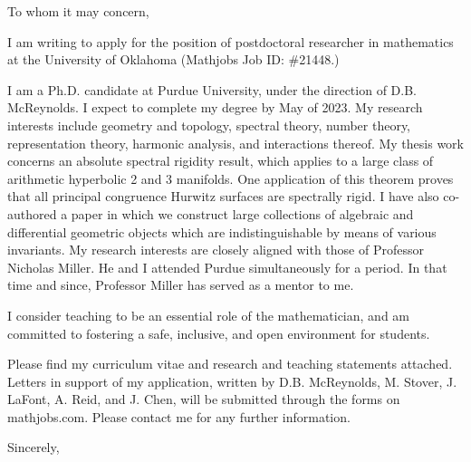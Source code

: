 \documentclass[a4paper,oneside,10pt]{letter}
\date{}
\makeatletter
\renewcommand{\closing}[1]{\par\nobreak\vspace{\parskip}%
	\stopbreaks
	\noindent
	\ifx\@empty\fromaddress\else
	\hspace*{\longindentation}\fi
	\parbox{\indentedwidth}{\raggedright
		\ignorespaces #1\\[2\medskipamount]%
		\ifx\@empty\fromsig
		\fromname
		\else \fromsig \fi\strut}%
	\par}
\makeatother
\begin{document}
	\begin{letter}{}
		
		\opening{To whom it may concern,} %
		I am writing to apply for the position of postdoctoral researcher in mathematics at the University of Oklahoma (Mathjobs Job ID: \#21448.)
		
		I am a Ph.D. candidate at Purdue University, under the direction of D.B. McReynolds. I expect to complete my degree by May of 2023. My research interests include geometry and topology, spectral theory, number theory, representation theory, harmonic analysis, and interactions thereof. My thesis work concerns an absolute spectral rigidity result, which applies to a large class of arithmetic hyperbolic 2 and 3 manifolds.  One application of this theorem proves that all principal congruence Hurwitz surfaces are spectrally rigid. I have also co-authored a paper in which we construct large collections of algebraic and differential geometric objects which are indistinguishable by means of various invariants. My research interests are closely aligned with those of Professor Nicholas Miller. He and I attended Purdue simultaneously for a period. In that time and since, Professor Miller has served as a mentor to me. 
		
		I consider teaching to be an essential role of the mathematician, and am committed to fostering a safe, inclusive, and open environment for students. 
		
		Please find my curriculum vitae and research and teaching statements attached. Letters in support of my application, written by D.B. McReynolds, M. Stover, J. LaFont, A. Reid, and J. Chen, will be submitted through the forms on mathjobs.com.  Please contact me for any further information. 
		
		
		
		\closing{Sincerely,} %
		
		
	\end{letter}
\end{document}

